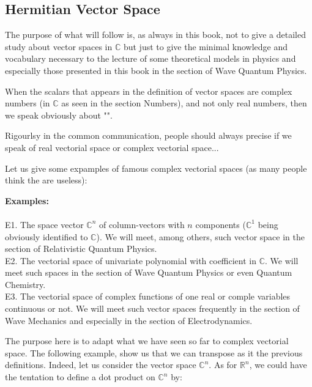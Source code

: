 	\pagebreak
	\subsection{Hermitian Vector Space}
	The purpose of what will follow is, as always in this book, not to give a detailed study about vector spaces in $\mathbb{C}$ but just to give the minimal knowledge and vocabulary necessary to the lecture of some theoretical models in physics and especially those presented in this book in the section of Wave Quantum Physics.
	
	When the scalars that appears in the definition of vector spaces are complex numbers (in $\mathbb{C}$ as seen in the section Numbers), and not only real numbers, then we speak obviously about "".
	
	\begin{tcolorbox}[title=Remark,colframe=black,arc=10pt]
	Rigourlsy in the common communication, people should always precise if we speak of real vectorial space or complex vectorial space...
	\end{tcolorbox}
	Let us give some expamples of famous complex vectorial spaces (as many people think the are useless):

	\begin{tcolorbox}[colframe=black,colback=white,sharp corners]
	\textbf{{\Large {}}Examples:}\\\\
	E1. The space vector $\mathbb{C}^n$ of column-vectors with $n$ components ($\mathbb{C}^1$ being obviously identified to $\mathbb{C}$). We will meet, among others, such vector space in the section of Relativistic Quantum Physics.\\
	
	E2. The vectorial space of univariate polynomial with coefficient in $\mathbb{C}$. We will meet such spaces in the section of Wave Quantum Physics or even Quantum Chemistry.\\
	
	E3. The vectorial space of complex functions of one real or comple variables continuous or not. We will meet such vector spaces frequently in the section of Wave Mechanics and especially in the section of Electrodynamics.
	\end{tcolorbox}
	The purpose here is to adapt what we have seen so far to complex vectorial space. The following example, show us that we can transpose as it the previous definitions. Indeed, let us consider the vector space $\mathbb{C}^n$. As for $\mathbb{R}^n$, we could have the tentation to define a dot product on $\mathbb{C}^n$ by:
	
